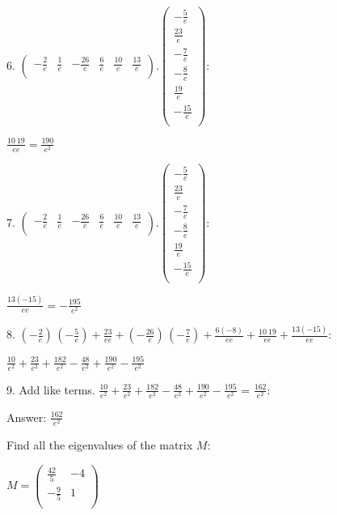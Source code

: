 \documentclass{article}
\begin{document}
6. $\left(
\begin{array}{cccccc}
-\frac{2}{e} & \frac{1}{e} & -\frac{26}{e} & \frac{6}{e} & \frac{10}{e} & \frac{13}{e} \\
\end{array}
\right).\left(
\begin{array}{c}
-\frac{5}{e} \\
 \frac{23}{e} \\
 -\frac{7}{e} \\
 -\frac{8}{e} \\
 \frac{19}{e} \\
 -\frac{15}{e} \\
\end{array}
\right):$

$\frac{10\ 19}{e e}=\frac{190}{e^2}$

7. $\left(
\begin{array}{cccccc}
-\frac{2}{e} & \frac{1}{e} & -\frac{26}{e} & \frac{6}{e} & \frac{10}{e} & \frac{13}{e} \\
\end{array}
\right).\left(
\begin{array}{c}
-\frac{5}{e} \\
 \frac{23}{e} \\
 -\frac{7}{e} \\
 -\frac{8}{e} \\
 \frac{19}{e} \\
 -\frac{15}{e} \\
\end{array}
\right):$

$\frac{13 (-15)}{e e}=-\frac{195}{e^2}$

8. $\left(-\frac{2}{e}\right)\, \left(-\frac{5}{e}\right)+\frac{23}{e e}+\left(-\frac{26}{e}\right)\, \left(-\frac{7}{e}\right)+\frac{6 (-8)}{e e}+\frac{10\ 19}{e e}+\frac{13 (-15)}{e e}$:

$\frac{10}{e^2}+\frac{23}{e^2}+\frac{182}{e^2}-\frac{48}{e^2}+\frac{190}{e^2}-\frac{195}{e^2}$

9. Add like terms. $\frac{10}{e^2}+\frac{23}{e^2}+\frac{182}{e^2}-\frac{48}{e^2}+\frac{190}{e^2}-\frac{195}{e^2}\text{ = }\frac{162}{e^2}$:

Answer: $\frac{162}{e^2}$

\pagebreak

Find all the eigenvalues of the matrix $M:$

$M=\left(
\begin{array}{cc}
\frac{42}{5} & -4 \\
 -\frac{9}{5} & 1 \\
\end{array}
\right)$
\end{document}
